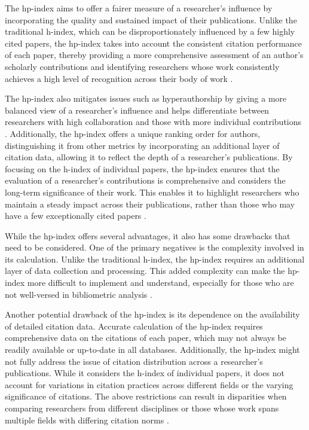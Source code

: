 The hp-index aims to offer a fairer measure of a researcher's influence by
incorporating the quality and sustained impact of their publications. Unlike
the traditional h-index, which can be disproportionately influenced by a few
highly cited papers, the hp-index takes into account the consistent citation
performance of each paper, thereby providing a more comprehensive assessment of
an author’s scholarly contributions and identifying researchers whose work
consistently achieves a high level of recognition across their body of work
\cite{singhal2023hp,singhal2023analysis}.

The hp-index also mitigates issues such as hyperauthorship by giving a more
balanced view of a researcher's influence and helps differentiate between
researchers with high collaboration and those with more individual
contributions \cite{singhal2023hp,singhal2023analysis}. Additionally, the
hp-index offers a unique ranking order for authors, distinguishing it from
other metrics by incorporating an additional layer of citation data, allowing
it to reflect the depth of a researcher's publications. By focusing on the
h-index of individual papers, the hp-index ensures that the evaluation of a
researcher’s contributions is comprehensive and considers the long-term
significance of their work. This enables it to highlight researchers who
maintain a steady impact across their publications, rather than those who may
have a few exceptionally cited papers \cite{singhal2023hp,singhal2023analysis}.

While the hp-index offers several advantages, it also has some drawbacks that
need to be considered. One of the primary negatives is the complexity involved
in its calculation. Unlike the traditional h-index, the hp-index requires an
additional layer of data collection and processing. This added complexity can
make the hp-index more difficult to implement and understand, especially for
those who are not well-versed in bibliometric analysis \cite{singhal2023hp}.

Another potential drawback of the hp-index is its dependence on the
availability of detailed citation data. Accurate calculation of the hp-index
requires comprehensive data on the citations of each paper, which may not
always be readily available or up-to-date in all databases. Additionally, the
hp-index might not fully address the issue of citation distribution across a
researcher's publications. While it considers the h-index of individual papers,
it does not account for variations in citation practices across different
fields or the varying significance of citations. The above restrictions can
result in disparities when comparing researchers from different disciplines or
those whose work spans multiple fields with differing citation norms
\cite{singhal2023hp,singhal2023analysis}.

